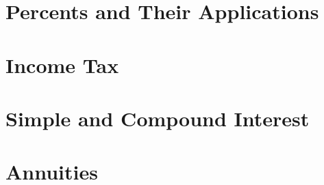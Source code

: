 \documentclass[9pt,letter,twoside,openright]{memoir}
\begin{document}
\section{Percents and Their Applications}


\section{Income Tax}


\section{Simple and Compound Interest}


\section{Annuities}

\end{document}
